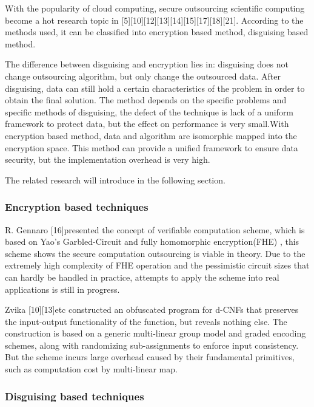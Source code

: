 \documentclass[runningheads,a4paper]{llncs}
\begin{document}
With the popularity of cloud computing, secure outsourcing scientific computing become a hot research topic in [5][10][12][13][14][15][17][18][21].
According to the methods used, it can be classified into encryption based method, disguising based method.

The difference between disguising and encryption lies in: 
disguising does not change outsourcing algorithm, but only change the outsourced data. After disguising, 
data can still hold a certain characteristics of the problem in order to obtain the final solution. 
The method depends on the specific problems and specific methods of disguising, 
the defect of the technique is lack of a uniform framework to protect data, 
but the effect on performance is very small.With encryption based method, data and algorithm are isomorphic mapped into the encryption space. 
This method can provide a unified framework to ensure data security, but the implementation overhead is very high.

The related research will introduce in the following section.
\subsubsection{Encryption based techniques}

R. Gennaro [16]presented the concept of verifiable computation scheme, which is based on Yao’s Garbled-Circuit and fully homomorphic encryption(FHE) , this scheme shows the secure computation outsourcing is viable in theory. Due to the extremely high complexity of FHE operation and the pessimistic circuit sizes that can hardly be handled in practice, attempts to apply the scheme into real applications is still in progress.

Zvika [10][13]etc constructed an obfuscated program for d-CNFs that preserves the input-output functionality of the function, but reveals nothing else. The construction is based on a generic multi-linear group model and graded encoding schemes, along with randomizing sub-assignments to enforce input consistency. But the scheme incurs large overhead caused by their fundamental primitives, such as computation cost by multi-linear map.
\subsubsection{Disguising based techniques}
\end{document}
